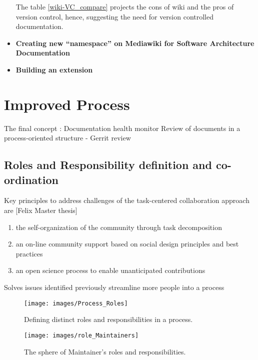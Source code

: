 \begin{itemize}
 The table \autoref{wiki-VC_compare} projects the cons of wiki and the pros of version control, hence, suggesting the need for version controlled documentation.
 
\item \textbf{Creating new \enquote{namespace} on Mediawiki for Software Architecture Documentation}


\item \textbf{Building an extension}


\end{itemize}


\section{Improved Process}
The final concept : 
Documentation health monitor
Review of documents in a process-oriented structure - Gerrit review 

\subsection{Roles and Responsibility definition and co-ordination}

Key principles to address challenges of the task-centered collaboration approach are [Felix Master thesis]


\begin{enumerate}
\item the self-organization of the community through task decomposition
\item an on-line community support based on social design principles and best practices
\item an open science process to enable unanticipated contributions
\end{enumerate}

\indent Solves issues identified previously
streamline more people into a process
\begin{figure}[H]
  \centering
  \texttt{[image: images/Process\_Roles]}
  \caption[Defining distinct roles and responsibilities in a process]{Defining distinct roles and responsibilities in a process.}\label{fig:Process_Roles}
\end{figure}
\begin{figure}[H]
  \centering
  \texttt{[image: images/role\_Maintainers]}
  \caption[The sphere of Maintainer's roles and responsibilities]{The sphere of Maintainer's roles and responsibilities.}\label{fig:role_Maintainers}
\end{figure}

